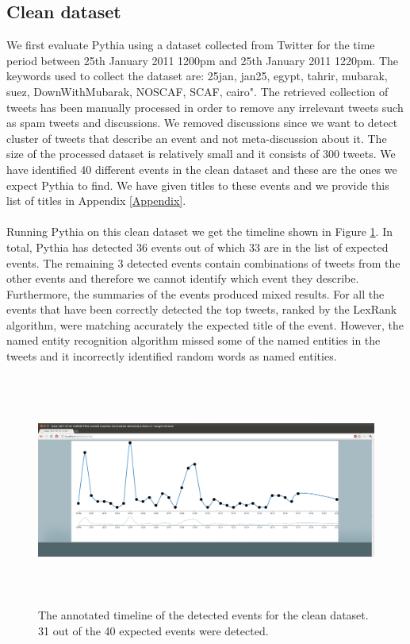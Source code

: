\subsection{Clean dataset}
We first evaluate Pythia using a dataset collected from Twitter for the time period between 25th January 2011 1200pm and 25th January 2011 1220pm. The keywords used to collect the dataset are: 25jan, jan25, egypt, tahrir, mubarak, suez, DownWithMubarak, NOSCAF, SCAF, cairo". The retrieved collection of tweets has been manually processed in order to remove any irrelevant tweets such as spam tweets and discussions. We removed discussions since we want to detect cluster of tweets that describe an event and not meta-discussion about it. The size of the processed dataset is relatively small and it consists of 300 tweets. We have identified 40 different events in the clean dataset and these are the ones we expect Pythia to find. We have given titles to these events and we provide this list of titles in Appendix \ref{Appendix}.\\\\ 
Running Pythia on this clean dataset we get the timeline shown in Figure \ref{Pythia4}. In total, Pythia has detected 36 events out of which 33 are in the list of expected events. The remaining 3 detected events contain combinations of tweets from the other events and therefore we cannot identify which event they describe. Furthermore, the summaries of the events produced mixed results. For all the events that have been correctly detected the top tweets, ranked by the LexRank algorithm, were matching accurately the expected title of the event. However, the named entity recognition algorithm missed some of the named entities in the tweets and it incorrectly identified random words as named entities.    
\begin{figure}[htbp]
  \begin{center}
    \includegraphics[height=3in, width=6in]{pythia4}
    \caption{The annotated timeline of the detected events for the clean dataset. 31 out of the 40 expected events were detected.}
    \label{Pythia4}
  \end{center}
\end{figure} 

